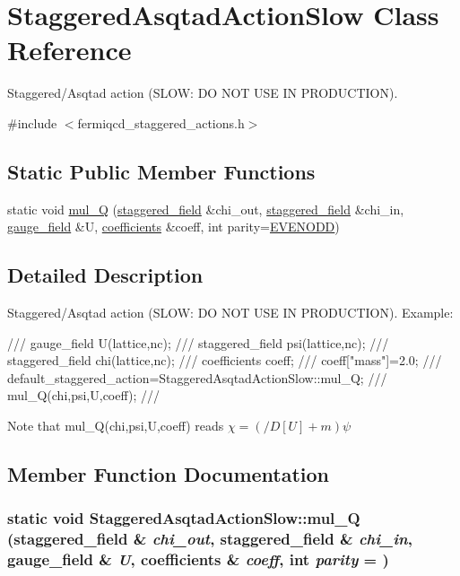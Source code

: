 \hypertarget{class_staggered_asqtad_action_slow}{
\section{StaggeredAsqtadActionSlow Class Reference}
\label{class_staggered_asqtad_action_slow}
}


Staggered/Asqtad action (SLOW: DO NOT USE IN PRODUCTION).  


{\ttfamily \#include $<$fermiqcd\_\-staggered\_\-actions.h$>$}\subsection*{Static Public Member Functions}
\begin{DoxyCompactItemize}
\item 
static void \hyperlink{class_staggered_asqtad_action_slow_a4f8d884eea1ada9aa030bf885f633472}{mul\_\-Q} (\hyperlink{classstaggered__field}{staggered\_\-field} \&chi\_\-out, \hyperlink{classstaggered__field}{staggered\_\-field} \&chi\_\-in, \hyperlink{classgauge__field}{gauge\_\-field} \&U, \hyperlink{classcoefficients}{coefficients} \&coeff, int parity=\hyperlink{mdp__global__vars_8h_a4c9de81f2de5a74b588107b6c0afb9ee}{EVENODD})
\end{DoxyCompactItemize}


\subsection{Detailed Description}
Staggered/Asqtad action (SLOW: DO NOT USE IN PRODUCTION). Example: \begin{DoxyVerb}
/// gauge_field U(lattice,nc);
/// staggered_field psi(lattice,nc);
/// staggered_field chi(lattice,nc);
/// coefficients coeff;
/// coeff["mass"]=2.0;
/// default_staggered_action=StaggeredAsqtadActionSlow::mul_Q;
/// mul_Q(chi,psi,U,coeff);
/// \end{DoxyVerb}
 Note that mul\_\-Q(chi,psi,U,coeff) reads $ \chi=(/\!\!\!D[U]+m)\psi $ 

\subsection{Member Function Documentation}
\hypertarget{class_staggered_asqtad_action_slow_a4f8d884eea1ada9aa030bf885f633472}{
\subsubsection[{mul\_\-Q}]{\setlength{\rightskip}{0pt plus 5cm}static void StaggeredAsqtadActionSlow::mul\_\-Q ({\bf staggered\_\-field} \& {\em chi\_\-out}, \/  {\bf staggered\_\-field} \& {\em chi\_\-in}, \/  {\bf gauge\_\-field} \& {\em U}, \/  {\bf coefficients} \& {\em coeff}, \/  int {\em parity} = {})}}
\label{class_staggered_asqtad_action_slow_a4f8d884eea1ada9aa030bf885f633472}


